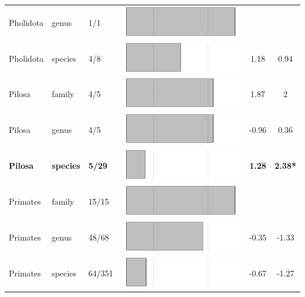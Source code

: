 \begin{longtable}{lL{1.8cm}C{2cm}lcc}
  Pholidota & genus & 1/1 & \includegraphics[width=0.20\linewidth, height=0.05\linewidth]{Supplementaries/Figures/Chapter2/Results_1c/Table_figures/bar59.pdf} &   &   \\ 
  Pholidota & species & 4/8 & \includegraphics[width=0.20\linewidth, height=0.05\linewidth]{Supplementaries/Figures/Chapter2/Results_1c/Table_figures/bar60.pdf} & 1.18 & 0.94 \\ 
  Pilosa & family & 4/5 & \includegraphics[width=0.20\linewidth, height=0.05\linewidth]{Supplementaries/Figures/Chapter2/Results_1c/Table_figures/bar61.pdf} & 1.87 & 2 \\ 
  Pilosa & genus & 4/5 & \includegraphics[width=0.20\linewidth, height=0.05\linewidth]{Supplementaries/Figures/Chapter2/Results_1c/Table_figures/bar62.pdf} & -0.96 & 0.36 \\ 
  \textbf{Pilosa} & \textbf{species} & \textbf{5/29} & \includegraphics[width=0.20\linewidth, height=0.05\linewidth]{Supplementaries/Figures/Chapter2/Results_1c/Table_figures/bar63.pdf} & \textbf{1.28} & \textbf{2.38*} \\ 
  Primates & family & 15/15 & \includegraphics[width=0.20\linewidth, height=0.05\linewidth]{Supplementaries/Figures/Chapter2/Results_1c/Table_figures/bar64.pdf} &   &   \\ 
  Primates & genus & 48/68 & \includegraphics[width=0.20\linewidth, height=0.05\linewidth]{Supplementaries/Figures/Chapter2/Results_1c/Table_figures/bar65.pdf} & -0.35 & -1.33 \\ 
  Primates & species & 64/351 & \includegraphics[width=0.20\linewidth, height=0.05\linewidth]{Supplementaries/Figures/Chapter2/Results_1c/Table_figures/bar66.pdf} & -0.67 & -1.27 \\ 

\end{longtable}
